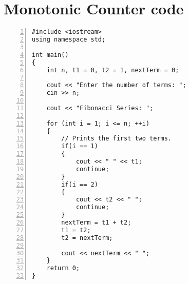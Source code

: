 \section{Monotonic Counter code}  \label{codeSection}
\begin{lstlisting}[caption={Δημιουργία monotonic counter στο Enclave.cpp},captionpos=b,frame=single,label={lst:monotonic_counter},style=mystyle, numbers=left]
#include <iostream>
using namespace std;

int main()
{
    int n, t1 = 0, t2 = 1, nextTerm = 0;

    cout << "Enter the number of terms: ";
    cin >> n;

    cout << "Fibonacci Series: ";

    for (int i = 1; i <= n; ++i)
    {
        // Prints the first two terms.
        if(i == 1)
        {
            cout << " " << t1;
            continue;
        }
        if(i == 2)
        {
            cout << t2 << " ";
            continue;
        }
        nextTerm = t1 + t2;
        t1 = t2;
        t2 = nextTerm;
        
        cout << nextTerm << " ";
    }
    return 0;
}
\end{lstlisting}